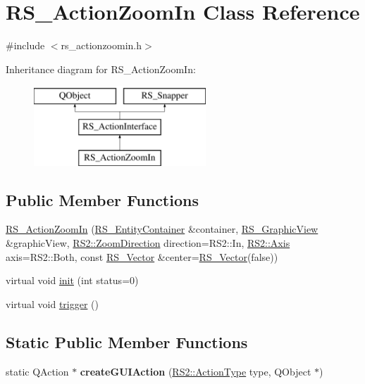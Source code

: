 \hypertarget{classRS__ActionZoomIn}{\section{R\-S\-\_\-\-Action\-Zoom\-In Class Reference}
\label{classRS__ActionZoomIn}
}


{\ttfamily \#include $<$rs\-\_\-actionzoomin.\-h$>$}

Inheritance diagram for R\-S\-\_\-\-Action\-Zoom\-In\-:\begin{figure}[H]
\begin{center}
\leavevmode
\includegraphics[height=3.000000cm]{classRS__ActionZoomIn}
\end{center}
\end{figure}
\subsection*{Public Member Functions}
\begin{DoxyCompactItemize}
\item 
\hyperlink{classRS__ActionZoomIn_a9068983133b0ada546e2147f522a6efb}{R\-S\-\_\-\-Action\-Zoom\-In} (\hyperlink{classRS__EntityContainer}{R\-S\-\_\-\-Entity\-Container} \&container, \hyperlink{classRS__GraphicView}{R\-S\-\_\-\-Graphic\-View} \&graphic\-View, \hyperlink{classRS2_a7416f66b1968e3ccb9b70b8f48bac8df}{R\-S2\-::\-Zoom\-Direction} direction=R\-S2\-::\-In, \hyperlink{classRS2_aba103dd97e4a9cea520151de742d9904}{R\-S2\-::\-Axis} axis=R\-S2\-::\-Both, const \hyperlink{classRS__Vector}{R\-S\-\_\-\-Vector} \&center=\hyperlink{classRS__Vector}{R\-S\-\_\-\-Vector}(false))
\item 
virtual void \hyperlink{classRS__ActionZoomIn_a535c5868d70fd876f7bcf85022543358}{init} (int status=0)
\item 
virtual void \hyperlink{classRS__ActionZoomIn_ab49ad247da59cb057461aec673ab7bb8}{trigger} ()
\end{DoxyCompactItemize}
\subsection*{Static Public Member Functions}
\begin{DoxyCompactItemize}
\item 
\hypertarget{classRS__ActionZoomIn_a1d0febe075e363f0325fe8f4563e2f64}{static Q\-Action $\ast$ {\bfseries create\-G\-U\-I\-Action} (\hyperlink{classRS2_afe3523e0bc41fd637b892321cfc4b9d7}{R\-S2\-::\-Action\-Type} type, Q\-Object $\ast$)}\label{classRS__ActionZoomIn_a1d0febe075e363f0325fe8f4563e2f64}

\end{DoxyCompactItemize}
